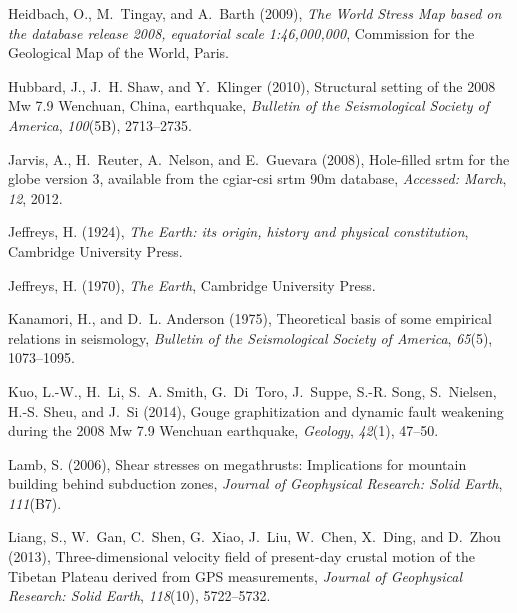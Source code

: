 \documentclass[twocolumn,jgrga]{AGUTeX}
\begin{document}
\begin{article}
{{\begin{thebibliography}{87}
Heidbach, O., M.~Tingay, and A.~Barth (2009), \textit{The World Stress Map
  based on the database release 2008, equatorial scale 1:46,000,000},
  Commission for the Geological Map of the World, Paris.

Hubbard, J., J.~H. Shaw, and Y.~Klinger (2010), Structural setting of the 2008
  {M}w 7.9 {W}enchuan, {C}hina, earthquake, \textit{Bulletin of the
  Seismological Society of America}, \textit{100}(5B), 2713--2735.

Jarvis, A., H.~Reuter, A.~Nelson, and E.~Guevara (2008), Hole-filled srtm for
  the globe version 3, available from the cgiar-csi srtm 90m database,
  \textit{Accessed: March}, \textit{12}, 2012.

Jeffreys, H. (1924), \textit{The Earth: its origin, history and physical
  constitution}, Cambridge University Press.

Jeffreys, H. (1970), \textit{The Earth}, Cambridge University Press.

Kanamori, H., and D.~L. Anderson (1975), Theoretical basis of some empirical
  relations in seismology, \textit{Bulletin of the Seismological Society of
  America}, \textit{65}(5), 1073--1095.

Kuo, L.-W., H.~Li, S.~A. Smith, G.~Di~Toro, J.~Suppe, S.-R. Song, S.~Nielsen,
  H.-S. Sheu, and J.~Si (2014), Gouge graphitization and dynamic fault
  weakening during the 2008 {M}w 7.9 {W}enchuan earthquake, \textit{Geology},
  \textit{42}(1), 47--50.

Lamb, S. (2006), Shear stresses on megathrusts: {I}mplications for mountain
  building behind subduction zones, \textit{Journal of Geophysical Research:
  Solid Earth}, \textit{111}(B7).

Liang, S., W.~Gan, C.~Shen, G.~Xiao, J.~Liu, W.~Chen, X.~Ding, and D.~Zhou
  (2013), Three-dimensional velocity field of present-day crustal motion of the
  {T}ibetan {P}lateau derived from {G}{P}{S} measurements, \textit{Journal of
  Geophysical Research: Solid Earth}, \textit{118}(10), 5722--5732.


\end{thebibliography}}}
\end{article}
\end{document}

